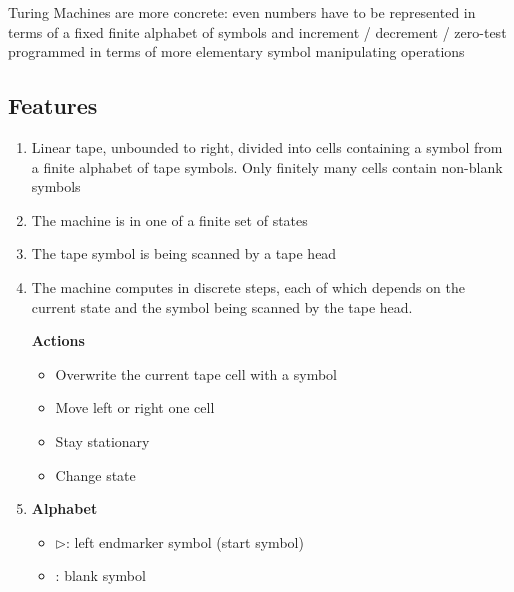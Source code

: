 \documentclass{article}
\begin{document}
Turing Machines are more concrete: even numbers have to be represented in terms of a fixed finite alphabet of symbols and increment / decrement / zero-test programmed in terms of more elementary symbol manipulating operations


\subsection{Features}
\begin{enumerate}
    \item Linear tape, unbounded to right, divided into cells containing a symbol from a finite alphabet of tape symbols. Only finitely many cells contain non-blank symbols
    \item The machine is in one of a finite set of states
    \item The tape symbol is being scanned by a tape head
    \item The machine computes in discrete steps, each of which depends on the current state and the symbol being scanned by the tape head.
    
    \bigskip
    \noindent
    \textbf{Actions}
    \begin{itemize}
        \item Overwrite the current tape cell with a symbol
        \item Move left or right one cell
        \item Stay stationary
        \item Change state
    \end{itemize}
    \item \textbf{Alphabet}
    \begin{itemize}
        \item \textbf{$\triangleright$}: left endmarker symbol (start symbol)
        \item \textbf{\textvisiblespace}: blank symbol
    \end{itemize}
\end{enumerate}
\end{document}
